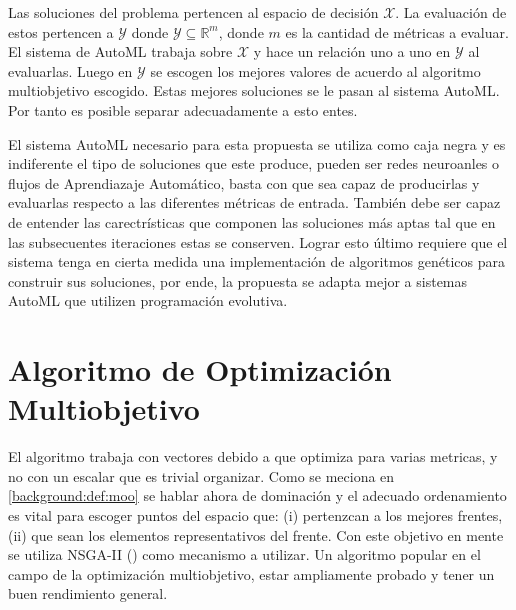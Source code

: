 Las soluciones del problema pertencen al espacio de decisi\'on $\mathcal{X}$. La evaluaci\'on de estos pertencen a $\mathcal{Y}$ donde $\mathcal{Y} \subseteq \mathbb{R}^m$, donde $m$ es la cantidad de m\'etricas a evaluar. El sistema de AutoML trabaja sobre $\mathcal{X}$ y hace un relaci\'on uno a uno en $\mathcal{Y}$ al evaluarlas. Luego en $\mathcal{Y}$ se escogen los mejores valores de acuerdo al algoritmo multiobjetivo escogido. Estas mejores soluciones se le pasan al sistema AutoML. Por tanto es posible separar adecuadamente a esto entes.


El sistema AutoML necesario para esta propuesta se utiliza como caja negra y  es indiferente el tipo de soluciones que este produce, pueden ser redes neuroanles o flujos de Aprendiazaje Autom\'atico, basta con que sea capaz de producirlas y evaluarlas respecto a las diferentes m\'etricas de entrada.
Tambi\'en debe ser capaz de entender las carectr\'isticas que componen las soluciones m\'as aptas tal que en las subsecuentes iteraciones estas se conserven. Lograr esto \'ultimo requiere que el sistema tenga en cierta medida una implementaci\'on de algoritmos gen\'eticos para construir sus soluciones, por ende, la propuesta se adapta mejor a sistemas AutoML que utilizen programaci\'on evolutiva.

\section{Algoritmo de Optimizaci\'on Multiobjetivo}

El algoritmo trabaja con vectores debido a que optimiza para varias metricas, y no con un escalar que es trivial organizar. Como se meciona en \ref{background:def:moo} se hablar ahora de dominaci\'on y el adecuado ordenamiento es vital para escoger puntos del espacio que: (i) pertenzcan a los mejores frentes, (ii) que sean los elementos representativos del frente. Con este objetivo en mente se utiliza NSGA-II (\cite{deb2002fast}) como mecanismo a utilizar. Un algoritmo popular en el campo de la optimizaci\'on multiobjetivo, estar ampliamente probado y tener un buen rendimiento general. 

